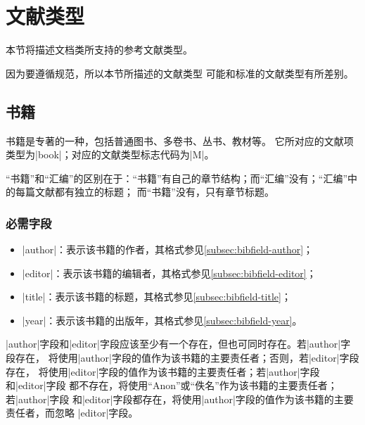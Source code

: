 \section{文献类型}\label{sec:bib-type}

本节将描述{\njuthesis}文档类所支持的参考文献类型。

\begin{note}
因为要遵循规范\cite{gbt7714-2005}，所以本节所描述的文献类型
可能和标准{\BibTeX}的文献类型有所差别。
\end{note}

\subsection{书籍}\label{subsec:bibtype-book}

书籍是专著的一种，包括普通图书、多卷书、丛书、教材等\cite{gbt3469-1983,gbt7714-2005}。
它所对应的{\BibTeX}文献项类型为|book|；对应的文献类型标志代码为|M|\cite{gbt3469-1983}。

\begin{note}
“书籍”和“汇编”的区别在于：“书籍”有自己的章节结构；而“汇编”没有；“汇编”中的每篇文献都有独立的标题；
而“书籍”没有，只有章节标题。
\end{note}

\subsubsection{必需字段}

\begin{itemize}
\item |author|：表示该书籍的作者，其格式参见\ref{subsec:bibfield-author}；
\item |editor|：表示该书籍的编辑者，其格式参见\ref{subsec:bibfield-editor}；
\item |title|：表示该书籍的标题，其格式参见\ref{subsec:bibfield-title}；
\item |year|：表示该书籍的出版年，其格式参见\ref{subsec:bibfield-year}。
\end{itemize}

\begin{note}
|author|字段和|editor|字段应该至少有一个存在，但也可同时存在。若|author|字段存在，
{\BibTeX}将使用|author|字段的值作为该书籍的主要责任者；否则，若|editor|字段存在，
{\BibTeX}将使用|editor|字段的值作为该书籍的主要责任者；若|author|字段和|editor|字段
都不存在，{\BibTeX}将使用``Anon''或``佚名''作为该书籍的主要责任者；若|author|字段
和|editor|字段都存在，{\BibTeX}将使用|author|字段的值作为该书籍的主要责任者，而忽略
|editor|字段。
\end{note}


